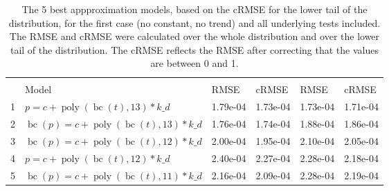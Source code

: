 \documentclass[12pt,a4paper]{article}
\DeclareMathOperator{\bc}{bc}
\DeclareMathOperator{\poly}{poly}
\begin{document}
\FloatBarrier
\begin{table}[!h]

\caption{\label{tab:5_best_all_1}\label{tab:best_all_1} The 5 best appproximation models, based on the cRMSE for the lower tail of the distribution, for the first case (no constant, no trend) and all underlying tests included. The RMSE and cRMSE were calculated over the whole distribution and over the lower tail of the distribution. The cRMSE reflects the RMSE after correcting that the values are between 0 and 1.}
\centering
\fontsize{10}{12}\selectfont
\begin{tabular}[t]{ll>{\raggedleft\arraybackslash}p{2cm}>{\raggedleft\arraybackslash}p{2cm}>{\raggedleft\arraybackslash}p{2cm}>{\raggedleft\arraybackslash}p{2cm}}
\toprule
\multicolumn{1}{c}{\textbf{}} & \multicolumn{1}{c}{\textbf{}} & \multicolumn{2}{c}{\textbf{Full Distribution}} & \multicolumn{2}{c}{\textbf{Lower Tail ($p \leq 0.2$)}} \\
\cmidrule(l{3pt}r{3pt}){3-4} \cmidrule(l{3pt}r{3pt}){5-6}
  & Model & RMSE & cRMSE & RMSE & cRMSE\\
\midrule
\rowcolor{gray!6}  1 & $p = c + \poly\left( \bc(t), 13 \right) * k\_d$ & 1.79e-04 & 1.73e-04 & 1.73e-04 & 1.71e-04\\
2 & $\bc(p) = c + \poly\left( \bc(t), 13 \right) * k\_d$ & 1.76e-04 & 1.74e-04 & 1.88e-04 & 1.86e-04\\
\rowcolor{gray!6}  3 & $\bc(p) = c + \poly\left( \bc(t), 12 \right) * k\_d$ & 2.00e-04 & 1.95e-04 & 2.10e-04 & 2.05e-04\\
4 & $p = c + \poly\left( \bc(t), 12 \right) * k\_d$ & 2.40e-04 & 2.27e-04 & 2.28e-04 & 2.18e-04\\
\rowcolor{gray!6}  5 & $\bc(p) = c + \poly\left( \bc(t), 11 \right) * k\_d$ & 2.16e-04 & 2.09e-04 & 2.28e-04 & 2.19e-04\\
\bottomrule
\end{tabular}
\end{table}

\begingroup\fontsize{10}{12}\selectfont
\end{document}

